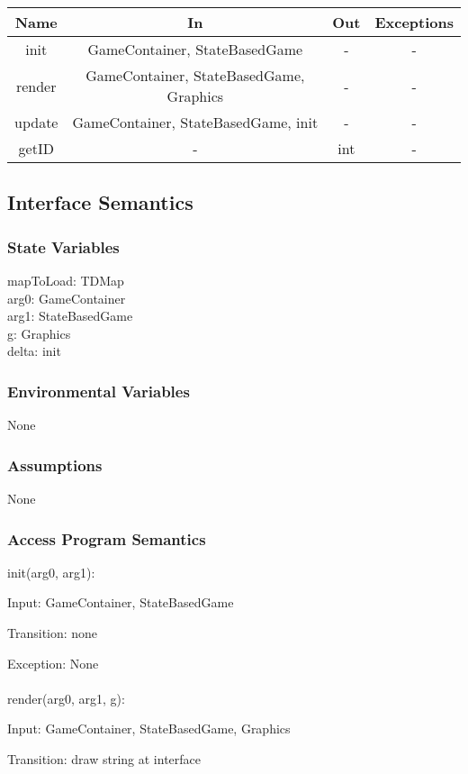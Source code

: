 \documentclass[12,english]{article}
\begin{document}
	\begin{tabular}[pos]{|c|c|c|c|}
	\hline
	\textbf{Name}& \textbf{In} & \textbf{Out} & \textbf{Exceptions} \\ 
	\hline
	init & GameContainer, StateBasedGame & - & - \\ \hline
	render & GameContainer, StateBasedGame, Graphics & - & - \\ \hline
	update & GameContainer, StateBasedGame, init & - & - \\ \hline
	getID & - & int & - \\ \hline
	
	
					
	\end{tabular}		
		
	\subsection{Interface Semantics}
		\subsubsection{State Variables}
		mapToLoad: TDMap\\
	    arg0: GameContainer\\
	    arg1: StateBasedGame\\
	    g: Graphics\\
	    delta: init\\
		\subsubsection{Environmental Variables}
		None
		\subsubsection{Assumptions}
        None

		\subsubsection{Access Program Semantics}
		init(arg0, arg1):
		
		Input: GameContainer, StateBasedGame
		
		Transition: none
		
		Exception: None\\
		\\
		render(arg0, arg1, g):
		
		Input: GameContainer, StateBasedGame, Graphics
		
		Transition: draw string at interface
		
\end{document}
